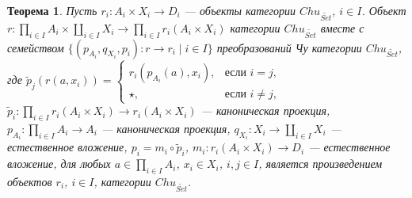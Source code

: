 \documentclass[a4paper,12pt]{article}
\newtheorem{theorem}{Теорема}
\begin{document}
\begin{theorem}\label{product}
    Пусть $r_i: A_i \times X_i \to D_i$ --- объекты категории $Chu_{\widetilde{Set}}$, $i \in I$. Объект $r: \prod_{i \in I} A_i \times \coprod_{i \in I} X_i \to \prod_{i \in I} r_i(A_i \times X_i)$ категории $Chu_{\widetilde{Set}}$ вместе с семейством $\{(p_{A_i},q_{X_i},p_i): r \to r_i \mid i \in I\}$ преобразований Чу категории $Chu_{\widetilde{Set}}$, где $\tilde{p}_j(r(a,x_i)) = 
    \begin{cases}
        r_i(p_{A_i}(a),x_i),& \text{если } i = j,\\
        \star,& \text{если } i \ne j,
    \end{cases}$
    $\tilde{p}_i: \prod_{i \in I} r_i(A_i \times X_i) \to r_i(A_i \times X_i)$ --- каноническая проекция, $p_{A_i}: \prod_{i \in I} A_i \to A_i$ --- каноническая проекция, $q_{X_i}: X_i \to \coprod_{i \in I} X_i$ --- естественное вложение, $p_i = m_i \circ \tilde{p}_i$, $m_i: r_i(A_i \times X_i) \to D_i$ --- естественное вложение, для любых $a \in \prod_{i \in I} A_i$, $x_i \in X_i$, $i,j \in I$, является произведением объектов $r_i$, $i \in I$, категории $Chu_{\widetilde{Set}}$.
\end{theorem}
\end{document}

